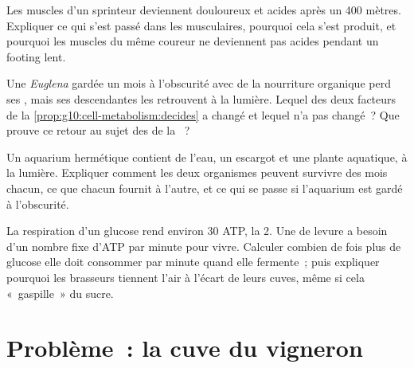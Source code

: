 \begin{exercise}[$\star\star\star$]\label{exo:g10:cell-metabolism:12}
Les muscles d'un sprinteur deviennent douloureux et acides après un
400 mètres. Expliquer ce qui s'est passé dans les  musculaires,
pourquoi cela s'est produit, et pourquoi les muscles du même coureur ne
deviennent pas acides pendant un footing lent.
\end{exercise}

\begin{exercise}[$\star\star\star$]\label{exo:g10:cell-metabolism:13}
Une \emph{Euglena} gardée un mois à l'obscurité avec de la nourriture
organique perd ses , mais ses descendantes les retrouvent
à la lumière. Lequel des deux facteurs de la
\cref{prop:g10:cell-metabolism:decides} a changé et lequel n'a pas
changé~? Que prouve ce retour au sujet des  de la ~?
\end{exercise}

\begin{exercise}[$\star\star\star$]\label{exo:g10:cell-metabolism:14}
Un aquarium hermétique contient de l'eau, un escargot et une plante
aquatique, à la lumière. Expliquer comment les deux organismes peuvent
survivre des mois chacun, ce que chacun fournit à l'autre, et ce qui se
passe si l'aquarium est gardé à l'obscurité.
\end{exercise}

\begin{exercise}[$\star\star\star$]\label{exo:g10:cell-metabolism:15}
La respiration d'un glucose rend environ 30 ATP, la  2. Une
 de levure a besoin d'un nombre fixe d'ATP par minute pour
vivre. Calculer combien de fois plus de glucose elle doit consommer par
minute quand elle fermente~; puis expliquer pourquoi les brasseurs
tiennent l'air à l'écart de leurs cuves, même si cela «~gaspille~» du
sucre.
\end{exercise}

\section{Problème~: la cuve du vigneron}


